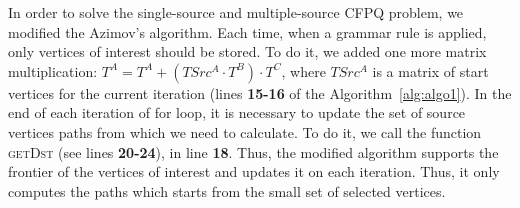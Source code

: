 In order to solve the single-source and multiple-source CFPQ problem, we modified the Azimov's algorithm.
Each time, when a grammar rule is applied, only vertices of interest should be stored.
To do it, we added one more matrix multiplication: $T^A = T^A + (TSrc^A \cdot T^B) \cdot T^ C$, where $TSrc^A$ is a matrix of start vertices for the current iteration (lines \textbf{15-16} of the Algorithm~\ref{alg:algo1}).
In the end of each iteration of for loop, it is necessary to update the set of source vertices paths from which we need to calculate.
To do it, we call the function \textsc{getDst} (see lines \textbf{20-24}), in line \textbf{18}.
Thus, the modified algorithm supports the frontier of the vertices of interest and updates it on each iteration.
Thus, it only computes the paths which starts from the small set of selected vertices.



